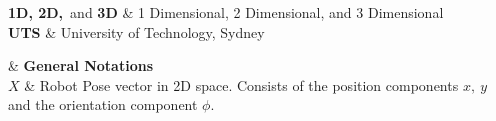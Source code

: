 %
{
\textbf{1D, 2D,}\ and \textbf{3D} & 1 Dimensional, 2 Dimensional, and 3 Dimensional \\
\textbf{UTS} & University of Technology, Sydney  \\
}


\clearpage %

 {

& \textbf{General Notations} \\

$X$ & Robot Pose vector in 2D space. Consists of the position components $x,\ y$ and the orientation component $\phi$. \\


}
